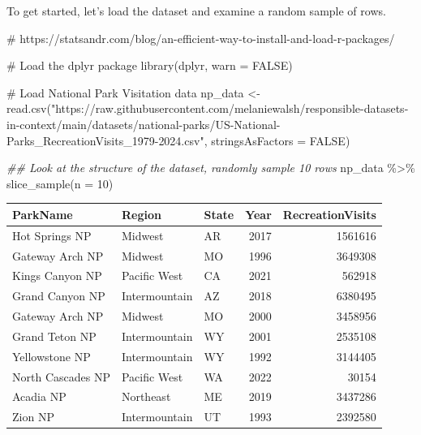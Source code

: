\documentclass[
  letterpaper,
  DIV=11,
  numbers=noendperiod]{scrartcl}
\newenvironment{Shaded}{\begin{snugshade}}{\end{snugshade}}
\newcommand{\AttributeTok}[1]{\textcolor[rgb]{0.40,0.45,0.13}{#1}}
\newcommand{\CommentTok}[1]{\textcolor[rgb]{0.37,0.37,0.37}{#1}}
\newcommand{\ConstantTok}[1]{\textcolor[rgb]{0.56,0.35,0.01}{#1}}
\newcommand{\DecValTok}[1]{\textcolor[rgb]{0.68,0.00,0.00}{#1}}
\newcommand{\DocumentationTok}[1]{\textcolor[rgb]{0.37,0.37,0.37}{\textit{#1}}}
\newcommand{\FunctionTok}[1]{\textcolor[rgb]{0.28,0.35,0.67}{#1}}
\newcommand{\NormalTok}[1]{\textcolor[rgb]{0.00,0.23,0.31}{#1}}
\newcommand{\OtherTok}[1]{\textcolor[rgb]{0.00,0.23,0.31}{#1}}
\newcommand{\SpecialCharTok}[1]{\textcolor[rgb]{0.37,0.37,0.37}{#1}}
\newcommand{\StringTok}[1]{\textcolor[rgb]{0.13,0.47,0.30}{#1}}
\begin{document}
To get started, let's load the dataset and examine a random sample of
rows.

\begin{Shaded}
\begin{Highlighting}[]
\CommentTok{\# https://statsandr.com/blog/an{-}efficient{-}way{-}to{-}install{-}and{-}load{-}r{-}packages/}

\CommentTok{\# Load the dplyr package}
\FunctionTok{library}\NormalTok{(dplyr, }\AttributeTok{warn =} \ConstantTok{FALSE}\NormalTok{)}

\CommentTok{\# Load National Park Visitation data}
\NormalTok{np\_data }\OtherTok{\textless{}{-}} \FunctionTok{read.csv}\NormalTok{(}\StringTok{"https://raw.githubusercontent.com/melaniewalsh/responsible{-}datasets{-}in{-}context/main/datasets/national{-}parks/US{-}National{-}Parks\_RecreationVisits\_1979{-}2024.csv"}\NormalTok{, }\AttributeTok{stringsAsFactors =} \ConstantTok{FALSE}\NormalTok{)}

\DocumentationTok{\#\# Look at the structure of the dataset, randomly sample 10 rows}
\NormalTok{np\_data }\SpecialCharTok{\%\textgreater{}\%} \FunctionTok{slice\_sample}\NormalTok{(}\AttributeTok{n =} \DecValTok{10}\NormalTok{)}
\end{Highlighting}
\end{Shaded}

\begin{longtable}[]{@{}lllrr@{}}
\toprule\noalign{}
ParkName & Region & State & Year & RecreationVisits \\
\midrule\noalign{}
\endhead
\bottomrule\noalign{}
\endlastfoot
Hot Springs NP & Midwest & AR & 2017 & 1561616 \\
Gateway Arch NP & Midwest & MO & 1996 & 3649308 \\
Kings Canyon NP & Pacific West & CA & 2021 & 562918 \\
Grand Canyon NP & Intermountain & AZ & 2018 & 6380495 \\
Gateway Arch NP & Midwest & MO & 2000 & 3458956 \\
Grand Teton NP & Intermountain & WY & 2001 & 2535108 \\
Yellowstone NP & Intermountain & WY & 1992 & 3144405 \\
North Cascades NP & Pacific West & WA & 2022 & 30154 \\
Acadia NP & Northeast & ME & 2019 & 3437286 \\
Zion NP & Intermountain & UT & 1993 & 2392580 \\
\end{longtable}
\end{document}
